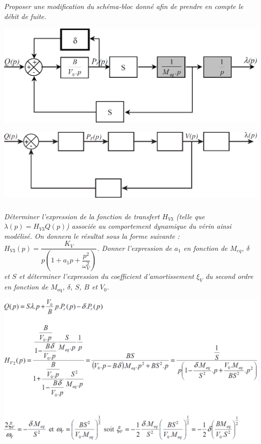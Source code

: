\begin{multicols}{2}
\begin{multicols}{2}
\subparagraph{}\textit{Proposer une modification du schéma-bloc donné afin de prendre en compte le débit de fuite.}
\ifprof
\begin{corrige}
\begin{center}
\includegraphics[width=.95\linewidth]{images/cor_07}
\end{center}
\end{corrige}
\else
\fi
\begin{center}
\includegraphics[width=\linewidth]{images/fig_08}
\end{center}


\subparagraph{}\textit{Déterminer l'expression de la fonction de transfert $H_{V3}$ (telle que $\lambda(p) =  H_{V3} Q(p)$) associée au comportement dynamique du vérin ainsi modélisé. On donnera le résultat sous la forme suivante : 
$H_{V3}(p)=\dfrac{K_V}{p\left(1+a_1 p + \dfrac{p^2}{\omega_V^2} \right)}$.  
Donner l'expression de $a_1$ en fonction de $M_{eq}$, $\delta$ et $S$ et déterminer l'expression du coefficient d'amortissement $\xi_V$ du second ordre en fonction de $M_{\text{eq}}$, $\delta$, $S$, $B$ et $V_0$.}
\ifprof
\begin{corrige}
\begin{center}
\includegraphics[width=.95\linewidth]{images/cor_08}
\end{center}
\end{corrige}
\else
\fi



\end{multicols}
\end{multicols}
